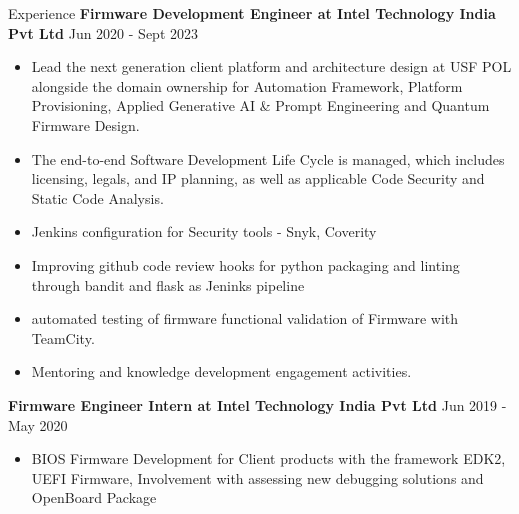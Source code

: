 \documentclass{resume} %
\begin{document}
\begin{rSection}{Experience}
{\textbf{Firmware Development Engineer at Intel Technology India Pvt Ltd}}  \hfill {Jun 2020 - Sept 2023}
\begin{itemize}
    \item Lead the next generation client platform and architecture design at USF POL alongside the domain ownership for Automation Framework, Platform Provisioning, Applied Generative AI \& Prompt Engineering and Quantum Firmware Design.
    \item The end-to-end Software Development Life Cycle is managed, which includes licensing, legals, and IP planning, as well as applicable Code Security and Static Code Analysis.
    \item Jenkins configuration for Security tools - Snyk, Coverity
    \item Improving github code review hooks for python packaging and linting through bandit and flask as Jeninks pipeline
    \item automated testing of firmware functional validation of Firmware with TeamCity.
    \item Mentoring and knowledge development engagement activities.
\end{itemize}

{\textbf{Firmware Engineer Intern at Intel Technology India Pvt Ltd}}  \hfill {Jun 2019 - May 2020}
\begin{itemize}
    \item BIOS Firmware Development for Client products with the framework EDK2, UEFI Firmware, Involvement with assessing new debugging solutions and OpenBoard Package
\end{itemize}




\end{rSection}
\end{document}
